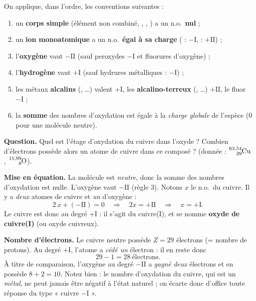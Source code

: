 \documentclass[11pt,a4paper]{article}
\begin{document}
\begin{regle}
On applique, dans l'ordre, les conventions suivantes :
\begin{enumerate}[label=(\arabic*),leftmargin=2.0em,topsep=2pt,itemsep=1pt]
  \item un \textbf{corps simple} (élément non combiné, , , ) a un n.o.\ \textbf{nul} ;
  \item un \textbf{ion monoatomique} a un n.o.\ \textbf{égal à sa charge} ( : $-\mathrm{I}$,  : $+\mathrm{II}$) ;
  \item l'\textbf{oxygène} vaut $-\mathrm{II}$ (sauf peroxydes $-\mathrm{I}$ et fluorures d'oxygène) ;
  \item l'\textbf{hydrogène} vaut $+\mathrm{I}$ (sauf hydrures métalliques : $-\mathrm{I}$) ;
  \item les métaux \textbf{alcalins} (, \ldots) valent $+\mathrm{I}$, les \textbf{alcalino-terreux} (, \ldots) $+\mathrm{II}$, le fluor $-\mathrm{I}$ ;
  \item la \textbf{somme} des nombres d'oxydation est égale à la \emph{charge globale} de l'espèce (0 pour une molécule neutre).
\end{enumerate}
\end{regle}

\begin{exemple}
\textbf{Question.} Quel est l'étage d'oxydation du cuivre dans l'oxyde  ? Combien d'électrons
possède alors un atome de cuivre dans ce composé ? (donnée : $\ce{^{63,54}_{29}Cu}$, $\ce{^{15,99}_{8}O}$).

\smallskip
\textbf{Mise en équation.} La molécule  est \emph{neutre}, donc la somme des nombres d'oxydation
est nulle. L'oxygène vaut $-\mathrm{II}$ (règle 3). Notons $x$ le n.o.\ du cuivre. Il y a \emph{deux}
atomes de cuivre et \emph{un} d'oxygène :
\[ 2\,x + (-\mathrm{II}) = 0 \quad\Longrightarrow\quad 2x = +\mathrm{II} \quad\Longrightarrow\quad \boxed{x = +\mathrm{I}}. \]
Le cuivre est donc au degré $+\mathrm{I}$ : il s'agit du cuivre(I), et  se nomme
\textbf{oxyde de cuivre(I)} (ou oxyde cuivreux).

\smallskip
\textbf{Nombre d'électrons.} Le cuivre neutre possède $Z = 29$ électrons (= nombre de protons). Au degré
$+\mathrm{I}$, l'atome a \emph{cédé un} électron : il en reste donc
\[ 29 - 1 = \boxed{28\ \text{électrons}}. \]
À titre de comparaison, l'oxygène au degré $-\mathrm{II}$ a \emph{gagné deux} électrons et en possède
$8 + 2 = 10$. Notez bien : le nombre d'oxydation du cuivre, qui est un \emph{métal}, ne peut jamais être
négatif à l'état naturel ; on écarte donc d'office toute réponse du type « cuivre $-\mathrm{I}$ ».
\end{exemple}
\end{document}
